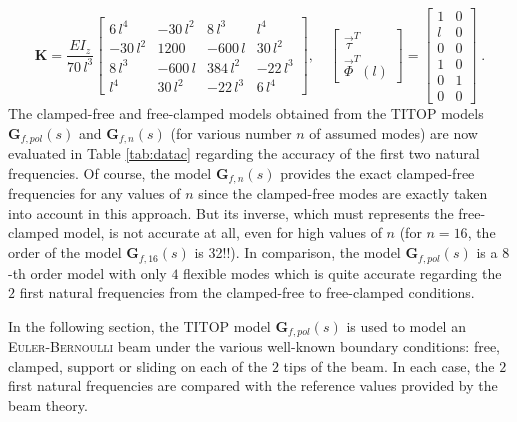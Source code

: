 \begin{equation}\label{eq:raideur}
\mathbf{K}=\frac{EI_z}{70\,l^3}\left[\begin{array}{cccc}
            6\,l^4 & -30\,l^2 &8\,l^3  &    l^4\\
                -30\,l^2 & 1200  & -600\,l & 30\,l^2\\
                 8\,l^3& -600\,l& 384\,l^2& -22\,l^3\\
                 l^4  & 30\,l^2 &-22\,l^3   &6\,l^4 
\end{array}\right],\quad
\left[\begin{array}{c} \vec{\tau}^T\\ \hline \vec{\Phi}^T(l)
\end{array}\right]=
\left[\begin{array}{cc}
1 & 0 \\l & 0\\ \hline 0& 0\\ 1 &0 \\0 & 1\\ 0 & 0
\end{array}\right]\;.
\end{equation}
The clamped-free and free-clamped models obtained  from the TITOP models $\mathbf{G}_{f,pol}(s)$ and $\mathbf{G}_{f,n}(s)$ (for various number $n$ of assumed modes) are now evaluated in Table \ref{tab:datac} regarding the accuracy of the first two natural frequencies. Of course, the model $\mathbf{G}_{f,n}(s)$ provides the exact clamped-free frequencies for any values of $n$ since the clamped-free modes are exactly taken into account in this approach. But its inverse, which must represents the free-clamped model, is not accurate at all, even for high values of $n$ (for $n=16$, the order of the model $\mathbf{G}_{f,16}(s)$ is 32!!). In comparison, the model $\mathbf{G}_{f,pol}(s)$ is a $8$-th order model with only $4$ flexible modes which is quite accurate regarding the $2$ first natural frequencies from the clamped-free to free-clamped conditions.

In the following section, the TITOP model $\mathbf{G}_{f,pol}(s)$ is used to model an \textsc{Euler-Bernoulli} beam under the various well-known boundary conditions: free, clamped, support or sliding on each of the $2$ tips of the beam. In each case, the $2$ first natural frequencies are compared with the reference values provided by the beam theory.

